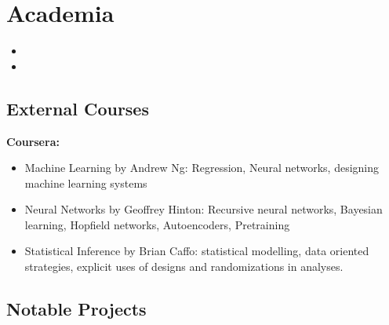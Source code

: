\documentclass[10pt,letterpaper,sans]{moderncv}        %
\begin{document}
\begin{small}
\begin{itemize}
\end{itemize}
\end{small}

\section{Academia}

\vspace{5pt}

\begin{itemize}

\item{}

\item{}  %

\end{itemize}
\vspace{2pt}

\subsection{External Courses}
\textbf{Coursera:}
\begin{itemize}
\item Machine Learning by Andrew Ng: Regression, Neural networks, designing machine learning systems
\item Neural Networks by Geoffrey Hinton: Recursive neural networks, Bayesian learning, Hopfield networks, Autoencoders, Pretraining
\item Statistical Inference by Brian Caffo: statistical modelling, data oriented strategies, explicit uses of designs and randomizations in analyses.
\end{itemize}

\vspace{4pt}

\subsection{Notable Projects}

\vspace{5pt}
\end{document}
